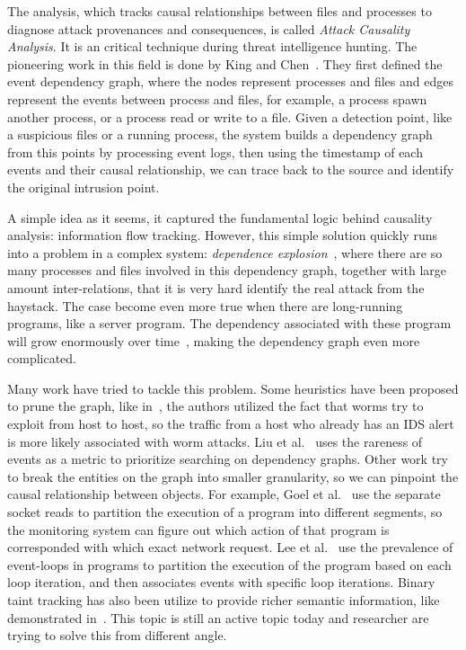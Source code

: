 The analysis, which tracks causal relationships between files and 
processes to diagnose attack provenances and consequences, is called
\textit{Attack Causality Analysis}. It is an critical technique
during threat intelligence hunting. The pioneering work in this field
is done by King and Chen~\cite{king2003backtracking}. They first defined
the event dependency graph, where the nodes represent processes and files
and edges represent the events between process and files, for example,
a process spawn another process, or a process read or write to a 
file. Given a detection point, like a suspicious files or a running
process, the system builds a dependency graph from this points by
processing event logs, then using the timestamp of each events and 
their causal relationship, we can trace back to the source and identify
the original intrusion point.

A simple idea as it seems, it captured the fundamental logic behind 
causality analysis: information flow tracking. However, this simple
solution quickly runs into a problem in a complex system: 
\textit{dependence explosion}~\cite{goel2005taser}, where there are 
so many processes and files involved in this dependency graph, together
with large amount inter-relations, that it is very hard identify the
real attack from the haystack. The case become even more true when there
are long-running programs, like a server program. The dependency 
associated with these program will grow enormously over 
time~\cite{lee2013high}, making the dependency graph even more 
complicated.

Many work have tried to tackle this problem. Some heuristics have been 
proposed to prune the graph, like in~\cite{king2005enriching}, the 
authors utilized the fact that worms try to exploit from host to host,
so the traffic from a host who already has an IDS alert is more likely
associated with worm attacks. Liu et al.~\cite{liu2018towards} uses
the rareness of events as a metric to prioritize searching on dependency
graphs. Other work try to break the entities on the graph into smaller 
granularity, so we can pinpoint the causal relationship between objects.
For example, Goel et al.~\cite{goel2005taser} use the separate socket
reads to partition the execution of a program into different segments, 
so the monitoring system can figure out which action of that program
is corresponded with which exact network request. Lee et 
al.~\cite{lee2013high} use the prevalence of event-loops in programs to
partition the execution of the program based on each loop iteration,
and then associates events with specific loop iterations. Binary taint
tracking has also been utilize to provide richer semantic information, 
like demonstrated in~\cite{ma2016protracer}. This topic is still an 
active topic today and researcher are trying to solve this from different
angle.